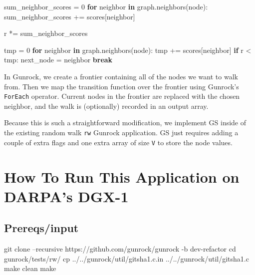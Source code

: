 \documentclass[10pt,oneside]{memoir}
\newenvironment{Shaded}{}{}
\newcommand{\BuiltInTok}[1]{#1}
\newcommand{\ControlFlowTok}[1]{\textcolor[rgb]{0.00,0.44,0.13}{\textbf{#1}}}
\newcommand{\DecValTok}[1]{\textcolor[rgb]{0.25,0.63,0.44}{#1}}
\newcommand{\FunctionTok}[1]{\textcolor[rgb]{0.02,0.16,0.49}{#1}}
\newcommand{\KeywordTok}[1]{\textcolor[rgb]{0.00,0.44,0.13}{\textbf{#1}}}
\newcommand{\NormalTok}[1]{#1}
\newcommand{\OperatorTok}[1]{\textcolor[rgb]{0.40,0.40,0.40}{#1}}
\begin{document}
\begin{Shaded}
\begin{Highlighting}[]
\NormalTok{sum_neighbor_scores }\OperatorTok{=} \DecValTok{0}
\ControlFlowTok{for}\NormalTok{ neighbor }\KeywordTok{in}\NormalTok{ graph.neighbors(node):}
\NormalTok{   sum_neighbor_scores }\OperatorTok{+=}\NormalTok{ scores[neighbor]}

\NormalTok{r }\OperatorTok{*=}\NormalTok{ sum_neighbor_scores}

\NormalTok{tmp }\OperatorTok{=} \DecValTok{0}
\ControlFlowTok{for}\NormalTok{ neighbor }\KeywordTok{in}\NormalTok{ graph.neighbors(node):}
\NormalTok{   tmp }\OperatorTok{+=}\NormalTok{ scores[neighbor]}
   \ControlFlowTok{if}\NormalTok{ r }\OperatorTok{<}\NormalTok{ tmp:}
\NormalTok{       next_node }\OperatorTok{=}\NormalTok{ neighbor}
       \ControlFlowTok{break}
\end{Highlighting}
\end{Shaded}

In Gunrock, we create a frontier containing all of the nodes we want to
walk from. Then we map the transition function over the frontier using
Gunrock's \texttt{ForEach} operator. Current nodes in the frontier are
replaced with the chosen neighbor, and the walk is (optionally) recorded
in an output array.

Because this is such a straightforward modification, we implement GS
inside of the existing random walk \texttt{rw} Gunrock application. GS
just requires adding a couple of extra flags and one extra array of size
\texttt{\textbar{}V\textbar{}} to store the node values.

\hypertarget{how-to-run-this-application-on-darpas-dgx-1-3}{%
\section{How To Run This Application on DARPA's
DGX-1}\label{how-to-run-this-application-on-darpas-dgx-1-3}}

\hypertarget{prereqsinput-2}{%
\subsection{Prereqs/input}\label{prereqsinput-2}}

\begin{Shaded}
\begin{Highlighting}[]
\FunctionTok{git}\NormalTok{ clone --recursive https://github.com/gunrock/gunrock -b dev-refactor}
\BuiltInTok{cd}\NormalTok{ gunrock/tests/rw/}
\FunctionTok{cp}\NormalTok{ ../../gunrock/util/gitsha1.c.in ../../gunrock/util/gitsha1.c}
\FunctionTok{make}\NormalTok{ clean}
\FunctionTok{make}
\end{Highlighting}
\end{Shaded}
\end{document}
